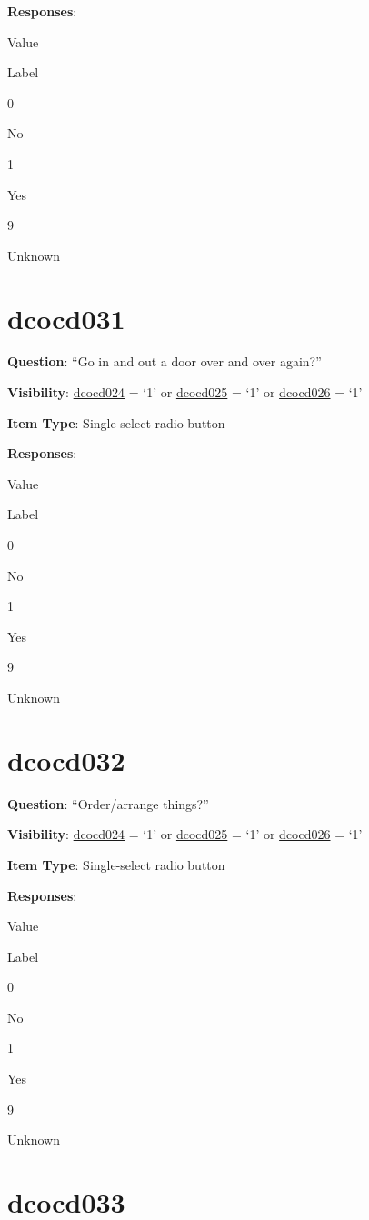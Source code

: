 \documentclass[]{book}
\begin{document}
\textbf{Responses}:

Value

Label

0

No

1

Yes

9

Unknown

\hypertarget{dcocd031}{%
\section{dcocd031}\label{dcocd031}}

\textbf{Question}: ``Go in and out a door over and over again?''

\textbf{Visibility}: \protect\hyperlink{dcocd024}{dcocd024} = `1' or \protect\hyperlink{dcocd025}{dcocd025} = `1' or \protect\hyperlink{dcocd026}{dcocd026} = `1'

\textbf{Item Type}: Single-select radio button

\textbf{Responses}:

Value

Label

0

No

1

Yes

9

Unknown

\hypertarget{dcocd032}{%
\section{dcocd032}\label{dcocd032}}

\textbf{Question}: ``Order/arrange things?''

\textbf{Visibility}: \protect\hyperlink{dcocd024}{dcocd024} = `1' or \protect\hyperlink{dcocd025}{dcocd025} = `1' or \protect\hyperlink{dcocd026}{dcocd026} = `1'

\textbf{Item Type}: Single-select radio button

\textbf{Responses}:

Value

Label

0

No

1

Yes

9

Unknown

\hypertarget{dcocd033}{%
\section{dcocd033}\label{dcocd033}}
\end{document}
